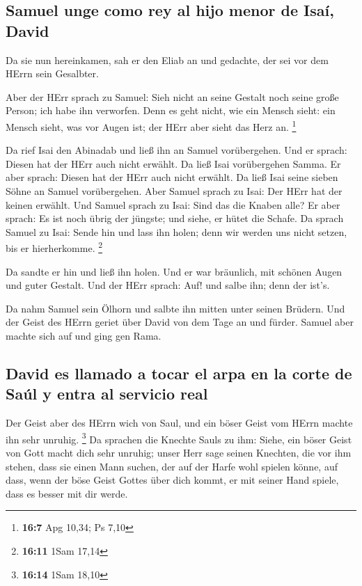 \hypertarget{samuel-unge-como-rey-al-hijo-menor-de-isauxed-david}{%
\subsection{Samuel unge como rey al hijo menor de Isaí,
David}\label{samuel-unge-como-rey-al-hijo-menor-de-isauxed-david}}

 Da sie nun hereinkamen, sah er den Eliab an und gedachte,
der sei vor dem HErrn sein Gesalbter.

 Aber der HErr sprach zu Samuel: Sieh nicht an seine
Gestalt noch seine große Person; ich habe ihn verworfen. Denn es geht
nicht, wie ein Mensch sieht: ein Mensch sieht, was vor Augen ist; der
HErr aber sieht das Herz an. \footnote{\textbf{16:7} Apg 10,34; Ps 7,10}

 Da rief Isai den Abinadab und ließ ihn an Samuel
vorübergehen. Und er sprach: Diesen hat der HErr auch nicht erwählt.
 Da ließ Isai vorübergehen Samma. Er aber sprach: Diesen
hat der HErr auch nicht erwählt.  Da ließ Isai seine
sieben Söhne an Samuel vorübergehen. Aber Samuel sprach zu Isai: Der
HErr hat der keinen erwählt.  Und Samuel sprach zu Isai:
Sind das die Knaben alle? Er aber sprach: Es ist noch übrig der jüngste;
und siehe, er hütet die Schafe. Da sprach Samuel zu Isai: Sende hin und
lass ihn holen; denn wir werden uns nicht setzen, bis er hierherkomme.
\footnote{\textbf{16:11} 1Sam 17,14}

 Da sandte er hin und ließ ihn holen. Und er war
bräunlich, mit schönen Augen und guter Gestalt. Und der HErr sprach:
Auf! und salbe ihn; denn der ist's.

 Da nahm Samuel sein Ölhorn und salbte ihn mitten unter
seinen Brüdern. Und der Geist des HErrn geriet über David von dem Tage
an und fürder. Samuel aber machte sich auf und ging gen Rama.

\hypertarget{david-es-llamado-a-tocar-el-arpa-en-la-corte-de-sauxfal-y-entra-al-servicio-real}{%
\subsection{David es llamado a tocar el arpa en la corte de Saúl y entra
al servicio
real}\label{david-es-llamado-a-tocar-el-arpa-en-la-corte-de-sauxfal-y-entra-al-servicio-real}}

 Der Geist aber des HErrn wich von Saul, und ein böser
Geist vom HErrn machte ihn sehr unruhig. \footnote{\textbf{16:14} 1Sam
  18,10}  Da sprachen die Knechte Sauls zu ihm: Siehe,
ein böser Geist von Gott macht dich sehr unruhig;  unser
Herr sage seinen Knechten, die vor ihm stehen, dass sie einen Mann
suchen, der auf der Harfe wohl spielen könne, auf dass, wenn der böse
Geist Gottes über dich kommt, er mit seiner Hand spiele, dass es besser
mit dir werde.

